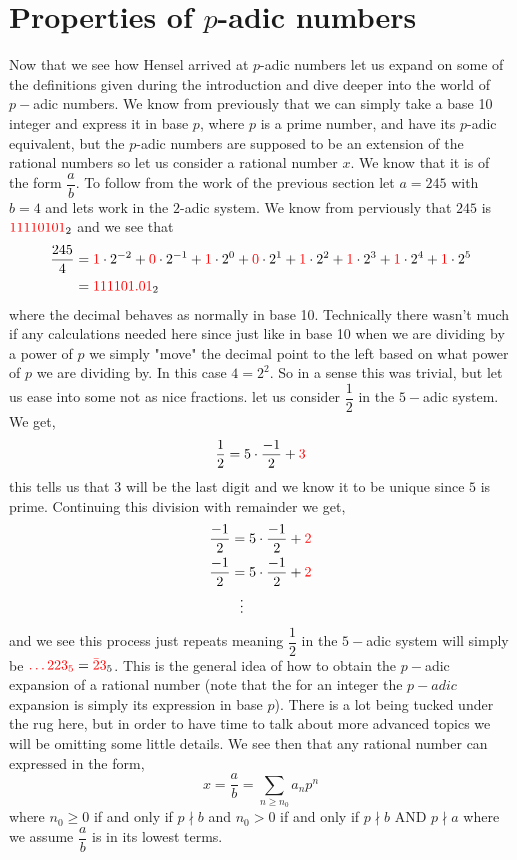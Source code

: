 \documentclass[12pt]{article}
\theoremstyle{definition}
\theoremstyle{remark}
\renewcommand{\geq}{\geqslant}
\newcommand{\tcr}[1]{\textcolor{red}{#1}}
\begin{document}
\section{Properties of $p$-adic numbers}
Now that we see how Hensel arrived at $p$-adic numbers let us expand on some of the definitions given during the introduction and dive deeper into the world of $p-$adic numbers. We know from previously that we can simply take a base 10 integer and express it in base $p$, where $p$ is a prime number, and have its $p$-adic equivalent, but the $p$-adic numbers are supposed to be an extension of the rational numbers so let us consider a rational number $x$. We know that it is of the form $\dfrac{a}{b}$. To follow from the work of the previous section let $a = 245$ with $b = 4$ and lets work in the $2$-adic system. We know from perviously that $245$ is $\tcr{11110101}_2$ and we see that
\begin{align*}
  \dfrac{245}{4} &= \tcr{1} \cdot 2^{-2} + \tcr{0} \cdot 2^{-1} + \tcr{1} \cdot 2^{0} + \tcr{0} \cdot 2^{1} + \tcr{1}\cdot 2^{2} + \tcr{1} \cdot 2^{3} + \tcr{1} \cdot 2^{4} + \tcr{1} \cdot 2^{5} \\
  &= \tcr{111101.01}_2 
\end{align*} 
where the decimal behaves as normally in base 10. Technically there wasn't much if any calculations needed here since just like in base 10 when we are dividing by a power of $p$ we simply "move" the decimal point to the left based on what power of $p$ we are dividing by. In this case $4 = 2^{2}$. So in a sense this was trivial, but let us ease into some not as nice fractions. let us consider $\dfrac{1}{2}$ in the $5-$adic system. We get,
\begin{align*}
  \dfrac{1}{2} = 5 \cdot \dfrac{-1}{2} + \tcr{3}
\end{align*}
this tells us that 3 will be the last digit and we know it to be unique since $5$ is prime. Continuing this division with remainder we get,
\begin{align*}
  \dfrac{-1}{2} &= 5 \cdot \dfrac{-1}{2} + \tcr{2} \\
  \dfrac{-1}{2} &= 5 \cdot \dfrac{-1}{2} + \tcr{2} \\
  &\ \ \vdots
\end{align*}
and we see this process just repeats meaning $\dfrac{1}{2}$ in the $5-$adic system will simply be $\tcr{\dots223_5} = \tcr{\bar{2}3}_5$. This is the general idea of how to obtain the $p-$adic expansion of a rational number (note that the for an integer the $p-adic$ expansion is simply its expression in base $p$). There is a lot being tucked under the rug here, but in order to have time to talk about more advanced topics we will be omitting some little details. We see then that any rational number can expressed in the form,
\[x = \dfrac{a}{b} = \sum_{n\geq n_0}a_np^{n}\]
where $n_0 \geq 0 $ if and only if $p\nmid b$ and $n_0 > 0$ if and only if $p\nmid b$ AND $p \nmid a$ where we assume $\dfrac{a}{b}$ is in its lowest terms. 
\end{document}
